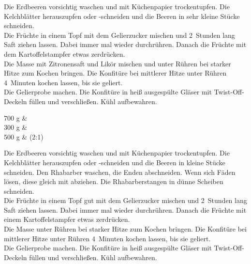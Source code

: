 
      \begin{zubereitung}
        Die Erdbeeren vorsichtig waschen und mit Küchenpapier trockentupfen.
	Die Kelchblätter herauszupfen oder -schneiden und die Beeren in sehr
	kleine Stücke schneiden. \\
	Die Früchte in einem Topf mit dem Gelierzucker mischen und 2~Stunden
	lang Saft ziehen lassen. Dabei immer mal wieder durchrühren. Danach
	die Früchte mit dem Kartoffelstampfer etwas zerdrücken. \\
	Die Masse mit Zitronensaft und Likör mischen und unter Rühren bei
	starker Hitze zum Kochen bringen. Die Konfitüre bei mittlerer Hitze
	unter Rühren 4~Minuten kochen lassen, bis sie geliert. \\
	Die Gelierprobe machen. Die Konfitüre in heiß ausgespülte Gläser mit
	Twist-Off-Deckeln füllen und verschließen. Kühl aufbewahren. \\
      \end{zubereitung}


      \begin{zutaten}
        700 g &  \\
	300 g &  \\
	500 g &  (2:1) \\
      \end{zutaten}


      \begin{zubereitung}
        Die Erdbeeren vorsichtig waschen und mit Küchenpapier trockentupfen.
	Die Kelchblätter herauszupfen oder -schneiden und die Beeren in kleine
	Stücke schneiden. Den Rhabarber waschen, die Enden abschneiden. Wenn
	sich Fäden lösen, diese gleich mit abziehen. Die Rhabarberstangen in
	dünne Scheiben schneiden. \\
	Die Früchte in einem Topf gut mit dem Gelierzucker mischen und
	2~Stunden lang Saft ziehen lassen. Dabei immer mal wieder durchrühren.
	Danach die Früchte mit einem Kartoffelstampfer etwas zerdrücken. \\
	Die Masse unter Rühren bei starker Hitze zum Kochen bringen. Die
	Konfitüre bei mittlerer Hitze unter Rühren 4~Minuten kochen lassen,
	bis sie geliert. \\
	Die Gelierprobe machen. Die Konfitüre in heiß ausgespülte Gläser mit
	Twist-Off-Deckeln füllen und verschließen. Kühl aufbewahren. \\
      \end{zubereitung}

